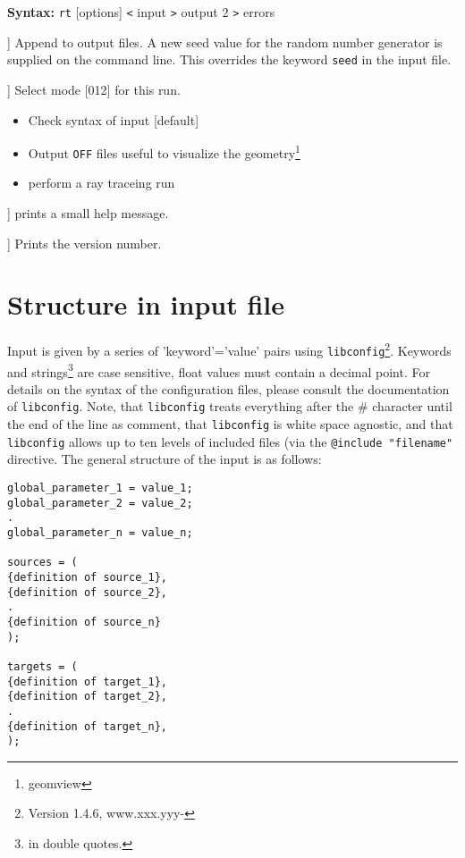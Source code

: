 \documentclass[10pt,a4paper,titlepage]{article}
\newcommand{\rt}{{\tt rt} }
\begin{document}
{\bf Syntax:} \rt [options] {\tt <} input {\tt >} output 2 {\tt >} errors
\vspace{1em}
\begin{list}{}
{\setlength{\leftmargin}{3.5cm}
\setlength{\labelwidth}{3.0cm}
\setlength{\rightmargin}{0.5cm}}

\item[\tt [--append|-a]] Append to output files. A new seed value for the random number generator is supplied on the command line. This overrides the keyword {\tt seed} in the input file.

\item[\tt [--mode|-m]] Select mode [012] for this run.
\begin{itemize}
\item[\tt -m0]{Check syntax of input [default]}
\item[\tt -m1]{Output {\tt OFF} files useful to visualize the geometry\footnote{geomview}}
\item[\tt -m2]{perform a ray traceing run}
\end{itemize}

\item[\tt [--help|-h]] prints a small help message.

\item[\tt [--Version|-V]] Prints the version number.

\end{list}


\section{Structure in input file}
Input is given by a series of 'keyword'='value' pairs using {\tt libconfig}\footnote{Version 1.4.6, www.xxx.yyy-}. Keywords and strings\footnote{in double quotes.} are case sensitive, float values must contain a decimal point. For details on the syntax of the configuration files, please consult the documentation of {\tt libconfig}. Note, that {\tt libconfig} treats everything after the \# character until the end of the line as comment, that {\tt libconfig} is white space agnostic, and that {\tt libconfig} allows up to ten levels of included files (via the {\tt @include "filename"} directive. The general structure of the input is as follows:

\begin{verbatim}
global_parameter_1 = value_1;
global_parameter_2 = value_2;
.
global_parameter_n = value_n;

sources = (
{definition of source_1},
{definition of source_2},
.
{definition of source_n}
);

targets = (
{definition of target_1},
{definition of target_2},
.
{definition of target_n},
);

\end{verbatim}
\end{document}
